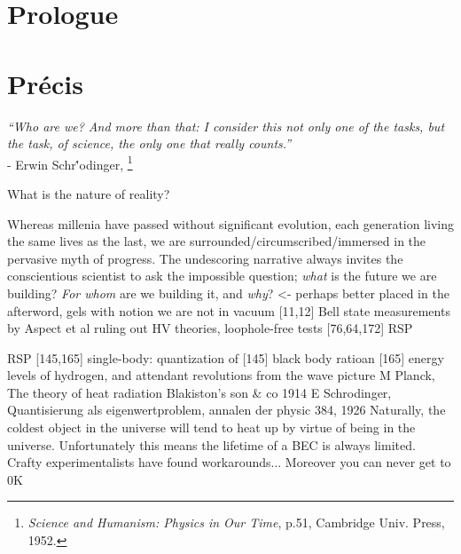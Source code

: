 \section*{Prologue}\label{sec:prologue}


\section*{Pr\'{e}cis}\label{sec:abstract}

\begin{adjustwidth}{6cm}{0cm}
\begin{flushright}
\emph{``Who are we? And more than that: I consider this not only one of the tasks, but the task, of science, the only one that really counts.''\\}
- Erwin Schr\''{o}dinger, \footnote{\emph{Science and Humanism: Physics in Our Time}, p.51, Cambridge Univ.
	Press, 1952.}\\
\end{flushright}
\end{adjustwidth}

	

What is the nature of reality?



	Whereas millenia have passed without significant evolution, each generation living the same lives as the last, we are surrounded/circumscribed/immersed in the pervasive myth of progress.
	The undescoring narrative always invites the conscientious scientist to ask the impossible question; \emph{what} is the future we are building? \emph{For whom} are we building it, and \emph{why}? <- perhaps better placed in the afterword, gels with notion we are not in vacuum
[11,12] Bell state measurements by Aspect et al ruling out HV theories, loophole-free tests [76,64,172] RSP


RSP [145,165] single-body: quantization of [145] black body ratioan [165] energy levels of hydrogen, and attendant revolutions from the wave picture  
		M Planck, The theory of heat radiation Blakiston's son \& co 1914
		E Schrodinger, Quantisierung als eigenwertproblem, annalen der physic 384, 1926
Naturally, the coldest object in the universe will tend to heat up by virtue of being in the universe.
	Unfortunately this means the lifetime of a BEC is always limited.
	Crafty experimentalists have found workarounds...
Moreover you can never get to 0K

